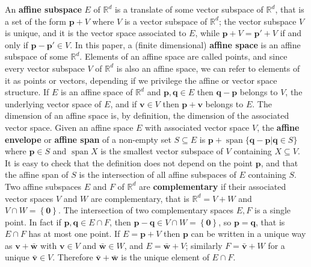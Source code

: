 \documentclass[12pt]{amsart}
\newcommand{\R}{\mathbb{R}}	%
\newcommand{\markdef}[1]{\textbf{#1}} %
\newcommand{\Mid}{\boldsymbol\mid}			%
\newcommand{\setof}[2]{\mathopen \{{#1}\Mid{#2} \mathclose\}} %
\newcommand{\setLR}[1]{\left \{ {#1} \right \}} %
\DeclareMathOperator{\Span}{span}
\theoremstyle{plain}
\theoremstyle{definition}
\theoremstyle{remark}
\begin{document}
An \markdef{affine subspace} \( E \) of \( \R^d \) is a translate of some vector subspace of  \( \R^d \), that is a set of the form \( \mathbf{p} + V \) where \( V \) is a vector subspace of \( \R^d \); the vector subspace \( V \) is unique, and it is the vector space associated to \( E \), while \( \mathbf{p} + V = \mathbf{p}' + V \) if and only if \( \mathbf{p} - \mathbf{p}' \in V \).
In this paper, a (finite dimensional) \markdef{affine space} is an affine subspace of some \( \R^d \).
Elements of an affine space are called points, and since every vector subspace \( V \) of \( \R^d \) is also an affine space, we can refer to elements of it as points or vectors, depending if we privilege the affine or vector space structure. 
If \( E \) is an affine space of \( \R^d \) and \( \mathbf{p} , \mathbf{q} \in E \) then \( \mathbf{q} - \mathbf{p} \) belongs to \( V \), the underlying vector space of \( E \), and if \( \mathbf{v} \in V \) then \( \mathbf{p} + \mathbf{v} \) belongs to \( E \).
The dimension of an affine space is, by definition, the dimension of the associated vector space.
Given an affine space \( E \) with associated vector space \( V \), the \markdef{affine envelope} or \markdef{affine span} of a non-empty set \( S \subseteq E \) is \( \mathbf{p} + \Span \setof{ \mathbf{q} - \mathbf{p} }{ \mathbf{q} \in S } \) where \( \mathbf{p} \in S \) and \( \Span X \) is the smallest vector subspace of \( V \) containing \( X \subseteq V \).
It is easy to check that the definition does not depend on the point \( \mathbf{p} \), and that the affine span of \( S \) is the intersection of all affine subspaces of \( E \) containing \( S \).
Two affine subspaces \( E \) and \( F \) of \( \R^d \) are \markdef{complementary} if their associated vector spaces \( V \) and \( W \) are complementary, that is \( \R^d = V + W \) and \( V \cap W = \setLR{\mathbf{0}} \).
The intersection of two complementary spaces \( E , F \) is a single point.
In fact if \( \mathbf{p} , \mathbf{q} \in E \cap F \), then \( \mathbf{p} - \mathbf{q} \in V \cap W = \setLR{\mathbf{0}} \), so \( \mathbf{p} = \mathbf{q} \), that is \( E \cap F \) has at most one point.
If \( E = \mathbf{p} + V \) then \( \mathbf{p} \) can be written in a unique way as \( \mathbf{v} + \bar{\mathbf{w}} \) with \( \mathbf{v} \in V \) and \( \bar{\mathbf{w}} \in W \), and \( E = \bar{\mathbf{w}} + V \); similarly \( F = \bar{\mathbf{v}} + W \) for a unique \( \bar{\mathbf{v}} \in V \).
Therefore \( \bar{\mathbf{v}} + \bar{\mathbf{w}} \) is the unique element of \( E \cap F \). 
\end{document}
